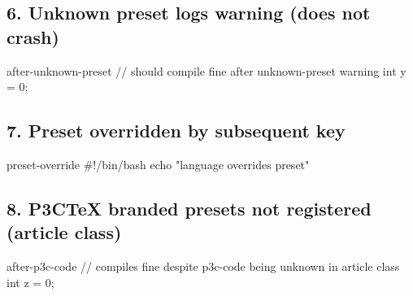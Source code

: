 \documentclass{article}
\begin{document}
\subsection*{6. Unknown preset logs warning (does not crash)}
\begin{pxCode}{after-unknown-preset}
// should compile fine after unknown-preset warning
int y = 0;
\end{pxCode}

\subsection*{7. Preset overridden by subsequent key}
\begin{pxCode}{preset-override}
#!/bin/bash
echo "language overrides preset"
\end{pxCode}

\subsection*{8. P3CTeX branded presets not registered (article class)}
\begin{pxCode}{after-p3c-code}
// compiles fine despite p3c-code being unknown in article class
int z = 0;
\end{pxCode}
\end{document}
